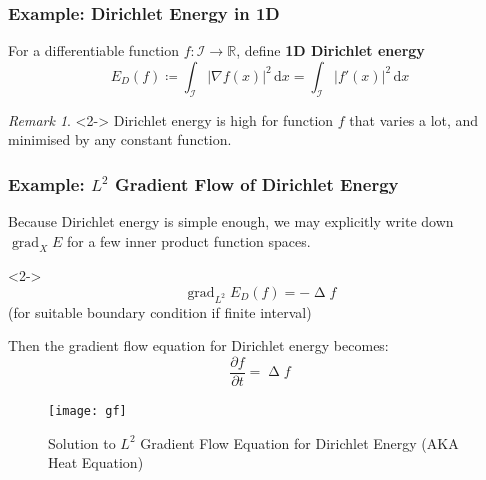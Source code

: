 \documentclass{beamer}
\theoremstyle{remark}
\newtheorem{remark}{Remark}
\newcommand{\intd}{\, \text{d}}
\DeclareMathOperator{\grad}{grad}
\DeclareMathOperator{\laplace}{\Delta}
\begin{document}
\begin{frame}
    \frametitle{Example: Dirichlet Energy in 1D}
    \begin{definition}
        For a differentiable function $f:\mathcal{I} \rightarrow \mathbb{R}$, define \textbf{1D Dirichlet energy}
        \begin{equation*}
            E_D \left( f \right) \coloneqq \int_{\mathcal{I}} \left| \nabla f(x) \right|^2 \intd x = \int_{\mathcal{I}} \left| f'(x) \right|^2 \intd x
        \end{equation*}
    \end{definition}
    \begin{remark}<2->
        Dirichlet energy is high for function $f$ that varies a lot, and minimised by any constant function.
    \end{remark}
\end{frame}

\begin{frame}
    \frametitle{Example: $L^2$ Gradient Flow of Dirichlet Energy}
    Because Dirichlet energy is simple enough, we may explicitly write down $\grad_{X} E$ for a few inner product function spaces.
    \begin{lemma}<2->
        \begin{equation*}
            \grad_{L^2} E_D (f) = - \laplace f
        \end{equation*}
        (for suitable boundary condition if finite interval)
    \end{lemma}

    {
    Then the gradient flow equation for Dirichlet energy becomes:
    \begin{equation}
        \frac{\partial f}{\partial t} = \laplace f
    \end{equation}
}
\end{frame}

\begin{frame}
    \begin{figure}[h]
        \centering
        \texttt{[image: gf]}
        \caption{Solution to $L^2$ Gradient Flow Equation for Dirichlet Energy (AKA Heat Equation)}
    \end{figure}
\end{frame}
\end{document}
